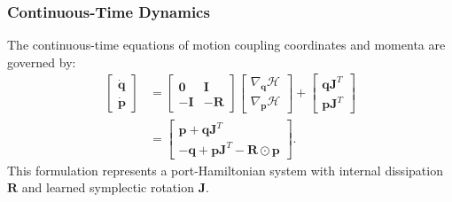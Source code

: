 \documentclass[10pt,journal,final]{IEEEtran}
\begin{document}
\subsubsection{Continuous-Time Dynamics}
The continuous-time equations of motion coupling coordinates and momenta are governed by:
\begin{equation}
\label{eq:hedo_ode}
\begin{aligned}
\begin{bmatrix} \dot{\mathbf{q}} \\ \dot{\mathbf{p}} \end{bmatrix} 
&= \begin{bmatrix} \mathbf{0} & \mathbf{I} \\ -\mathbf{I} & -\mathbf{R} \end{bmatrix} 
\begin{bmatrix} \nabla_{\mathbf{q}}\mathcal{H} \\ \nabla_{\mathbf{p}}\mathcal{H} \end{bmatrix} 
+ \begin{bmatrix} \mathbf{q} \mathbf{J}^T \\ \mathbf{p} \mathbf{J}^T \end{bmatrix} \\
&= \begin{bmatrix} \mathbf{p} + \mathbf{q} \mathbf{J}^T \\ -\mathbf{q} + \mathbf{p} \mathbf{J}^T - \mathbf{R} \odot \mathbf{p} \end{bmatrix}.
\end{aligned}
\end{equation}
This formulation represents a port-Hamiltonian system with internal dissipation $\mathbf{R}$ and learned symplectic rotation $\mathbf{J}$.
\end{document}
